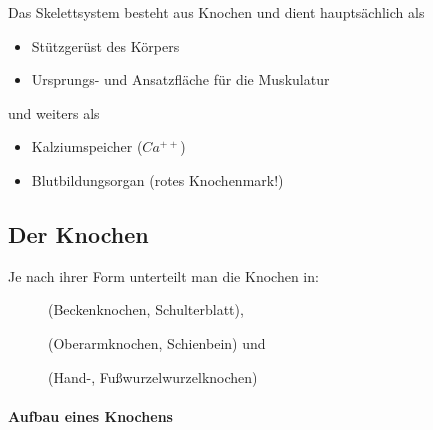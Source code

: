 Das Skelettsystem besteht aus Knochen und dient 
hauptsächlich als

\begin{itemize}
    \item Stützgerüst  des Körpers
    \item Ursprungs-  und Ansatzfläche für die Muskulatur
\end{itemize}

und weiters als

\begin{itemize}
    \item Kalziumspeicher ($Ca^{++}$)
    \item Blutbildungsorgan (rotes Knochenmark!)
\end{itemize}

\subsection{Der Knochen}

Je nach ihrer Form unterteilt man die Knochen in: 
\begin{description}
    \item[] (Beckenknochen,
    Schulterblatt),
    \item[] (Oberarmknochen, Schienbein)
    und
    \item[] (Hand-,
    Fußwurzelwurzelknochen)
\end{description}

\paragraph{Aufbau eines Knochens}~



